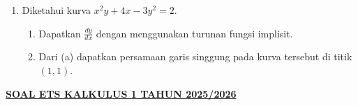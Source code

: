 \documentclass[10pt,openany,a4paper]{article}
\theoremstyle{definition}
\theoremstyle{definition}
\theoremstyle{plain}
\begin{document}
\begin{enumerate}
            \begin{enumerate}
                \item Tentukan $\displaystyle\lim_{x\to 1}f(x)$.
                \item Buatlah sketsa grafik $y=f(x)$.
            \end{enumerate}
            \item Diketahui kurva $x^2y+4x-3y^2=2$.
            \begin{enumerate}
                \item Dapatkan $\frac{dy}{dx}$ dengan menggunakan turunan fungsi implisit.
                \item Dari (a) dapatkan persamaan garis singgung pada kurva tersebut di titik $(1,1)$.
            \end{enumerate}
        \end{enumerate}
\newpage
 \begin{center}
	{\underline{\textbf{\MakeUppercase{Soal ETS Kalkulus 1 Tahun 2025/2026}}}}
    \end{center}
\end{document}

